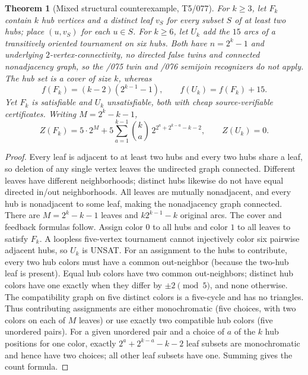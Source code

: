 \documentclass[11pt]{article}
\newtheorem{theorem}{Theorem}
\begin{document}
\begin{theorem}[Mixed structural counterexample, T5/077]
For $k\ge3$, let $F_k$ contain $k$ hub vertices and a distinct
leaf $v_S$ for every subset $S$ of at least two hubs; place
$(u,v_S)$ for each $u\in S$. For $k\ge6$, let $U_k$
add the $15$ arcs of a transitively oriented tournament on
six hubs. Both have $n=2^k-1$ and underlying $2$-vertex-connectivity,
no directed false twins and connected nonadjacency graph, so
the /075 twin and /076 semijoin recognizers do not apply.
The hub set is a cover of size $k$, whereas
\[
f(F_k)=(k-2)(2^{k-1}-1),\qquad f(U_k)=f(F_k)+15.
\]
Yet $F_k$ is satisfiable and $U_k$ unsatisfiable, both with
cheap source-verifiable certificates. Writing $M=2^k-k-1$,
\[
Z(F_k)=5\cdot2^M+
5\sum_{a=1}^{k-1}
 {k\choose a}\,2^{2^a+2^{k-a}-k-2},
\qquad Z(U_k)=0.
\]
\end{theorem}
\begin{proof}
Every leaf is adjacent to at least two hubs and every two
hubs share a leaf, so deletion of any single vertex leaves
the undirected graph connected. Different leaves have different
neighborhoods; distinct hubs likewise do not have equal directed
in/out neighborhoods. All leaves are mutually nonadjacent,
and every hub is nonadjacent to some leaf, making the
nonadjacency graph connected. There are
$M=2^k-k-1$ leaves and
$k2^{k-1}-k$ original arcs. The cover and feedback formulas
follow. Assign color $0$ to all hubs and color $1$ to all
leaves to satisfy $F_k$. A loopless five-vertex tournament
cannot injectively color six pairwise adjacent hubs, so $U_k$
is UNSAT.
For an assignment to the hubs to contribute, every two hub
colors must have a common out-neighbor (because the two-hub
leaf is present). Equal hub colors have two common
out-neighbors; distinct hub colors have one exactly when
they differ by $\pm2\pmod5$, and none otherwise. The
compatibility graph on five distinct colors is a five-cycle
and has no triangles. Thus contributing assignments are
either monochromatic (five choices, with two colors on each
of $M$ leaves) or use exactly two compatible hub colors
(five unordered pairs). For a given unordered pair and a
choice of $a$ of the $k$ hub positions for one color,
exactly $2^a+2^{k-a}-k-2$ leaf subsets are monochromatic
and hence have two choices; all other leaf subsets have
one. Summing gives the count formula.
\end{proof}
\end{document}

